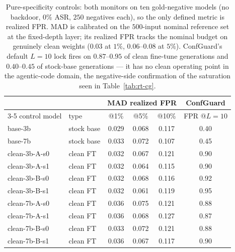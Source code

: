 \documentclass[11pt]{article}
\begin{document}
\begin{table}[H]
\centering
\footnotesize
\setlength{\tabcolsep}{5pt}
\begin{tabular}{llcccc}
\toprule
 & & \multicolumn{3}{c}{MAD realized FPR} & ConfGuard \\
\cmidrule(lr){3-5}
control model & type & @1\% & @5\% & @10\% & FPR @$L{=}10$ \\
\midrule
base-3b              & stock base  & 0.029 & 0.068 & 0.117 & 0.40 \\
base-7b              & stock base  & 0.033 & 0.072 & 0.107 & 0.45 \\
clean-3b-A-s0        & clean FT    & 0.032 & 0.067 & 0.121 & 0.90 \\
clean-3b-A-s1        & clean FT    & 0.032 & 0.064 & 0.115 & 0.90 \\
clean-3b-B-s0        & clean FT    & 0.032 & 0.068 & 0.116 & 0.92 \\
clean-3b-B-s1        & clean FT    & 0.032 & 0.061 & 0.119 & 0.95 \\
clean-7b-A-s0        & clean FT    & 0.036 & 0.075 & 0.121 & 0.88 \\
clean-7b-A-s1        & clean FT    & 0.036 & 0.068 & 0.127 & 0.87 \\
clean-7b-B-s0        & clean FT    & 0.033 & 0.072 & 0.121 & 0.88 \\
clean-7b-B-s1        & clean FT    & 0.036 & 0.067 & 0.117 & 0.90 \\
\bottomrule
\end{tabular}
\caption{Pure-specificity controls: both monitors on ten gold-negative models (no backdoor, $0\%$
ASR, $250$ negatives each), so the only defined metric is realized FPR. MAD is calibrated on the
$500$-input nominal reference set at the fixed-depth layer; its realized FPR tracks the nominal
budget on genuinely clean weights ($0.03$ at $1\%$, $0.06$--$0.08$ at $5\%$). ConfGuard's default
$L{=}10$ lock fires on $0.87$--$0.95$ of clean fine-tune generations and $0.40$--$0.45$ of
stock-base generations --- it has no clean operating point in the agentic-code domain, the
negative-side confirmation of the saturation seen in Table~\ref{tab:rt-cg}.}
\label{tab:rt-ctrl}
\end{table}
\end{document}
